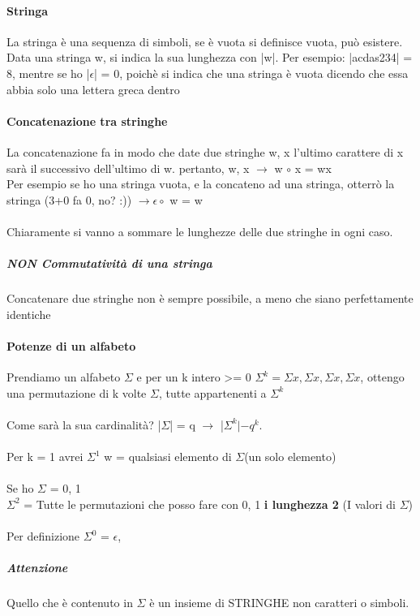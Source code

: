 \documentclass[12pt, a4paper, openany, oneside]{book}
\begin{document}
\paragraph{Stringa} La stringa è una sequenza di simboli, se è 
vuota si definisce vuota, può esistere. \\ Data una stringa w, si indica la sua
lunghezza con |w|. Per esempio: |acdas234| = 8, mentre se ho |$\epsilon$| = 0,
poichè si indica che una stringa è vuota dicendo che essa abbia solo una lettera
greca dentro
\paragraph{Concatenazione tra stringhe}
La concatenazione fa in modo che date due stringhe w, x l'ultimo carattere di x
sarà il successivo dell'ultimo di w. pertanto, w, x $\to$ w $\circ$ x = wx \\
Per esempio se ho una stringa vuota, e la concateno ad una stringa, otterrò la
stringa (3+0 fa 0, no? :)) $\to \epsilon \circ $ w = w \\ \\
Chiaramente si vanno a sommare le lunghezze delle due stringhe in ogni caso. 
\subparagraph{NON Commutatività di una stringa}
Concatenare due stringhe non è sempre possibile, a meno che siano perfettamente
identiche
\paragraph{Potenze di un alfabeto} 
Prendiamo un alfabeto $\Sigma$ e per un k intero >= 0 $\Sigma ^{k} = \Sigma x, 
\Sigma x, \Sigma x, \Sigma x$, ottengo una permutazione di k volte $\Sigma$, tutte
appartenenti a $\Sigma ^{k}$ \\ \\
Come sarà la sua cardinalità? |$\Sigma$| = q $\to$  |$\Sigma ^{k}| - q^{k}$.
\\ \\ 
Per k = 1 avrei $\Sigma ^{1}$ w = qualsiasi elemento di $\Sigma$(un solo elemento) 
\\ \\
Se ho $\Sigma$ = {0, 1} \\
$\Sigma ^{2}$ = Tutte le permutazioni che posso fare con 0, 1 \textbf{i lunghezza 2}
(I valori di $\Sigma$)
\\ \\
Per definizione $\Sigma ^{0}$ = {$\epsilon$}, \\
\subparagraph{Attenzione} Quello che è contenuto in $\Sigma$ è un insieme di STRINGHE
non caratteri o simboli. 
\end{document}
